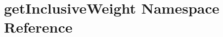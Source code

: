 \hypertarget{namespacegetInclusiveWeight}{
\section{getInclusiveWeight Namespace Reference}
\label{namespacegetInclusiveWeight}
}
